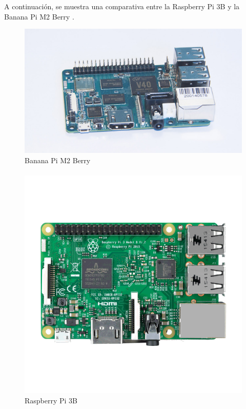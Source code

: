 A continuación, se muestra una comparativa entre la Raspberry Pi 3B y la Banana Pi M2 Berry \citep{MarcoTeorico21}\citep{MarcoTeorico22}.

\begin{figure}[H]
	\centering
	\includegraphics[scale=.8]{Capitulo2/images/bananaPi.jpg}
	\caption{Banana Pi M2 Berry}
	\label{fig:diagrama_dispMonitoreo}
\end{figure}

\paragraph{}
\begin{figure}[H]
	\centering
	\includegraphics[scale=.23]{Capitulo2/images/raspberry.png}
	\caption{Raspberry Pi 3B}
	\label{fig:diagrama_dispMonitoreo}
\end{figure}

